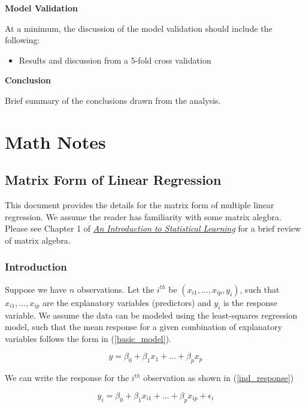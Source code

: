 \documentclass[]{book}
\providecommand{\tightlist}{%
  \setlength{\itemsep}{0pt}\setlength{\parskip}{0pt}}
\begin{document}
\textbf{Model Validation}

At a minimum, the discussion of the model validation should include the
following:

\begin{itemize}
\tightlist
\item
  Results and discussion from a 5-fold cross validation
\end{itemize}

\textbf{Conclusion}

Brief summary of the conclusions drawn from the analysis.

\part{Math Notes}\label{part-math-notes}

\chapter{Matrix Form of Linear
Regression}\label{matrix-form-of-linear-regression}

This document provides the details for the matrix form of multiple
linear regression. We assume the reader has familiarity with some matrix
alegbra. Please see Chapter 1 of
\href{https://www-bcf.usc.edu/~gareth/ISL/}{\emph{An Introduction to
Statistical Learning}} for a brief review of matrix algebra.

\section{Introduction}\label{introduction-2}

Suppose we have \(n\) observations. Let the \(i^{th}\) be
\((x_{i1}, \ldots, x_{ip}, y_i)\), such that \(x_{i1}, \ldots, x_{ip}\)
are the explanatory variables (predictors) and \(y_i\) is the response
variable. We assume the data can be modeled using the least-squares
regression model, such that the mean response for a given combination of
explanatory variables follows the form in (\ref{basic_model}).

\begin{equation}
\label{basic_model}
y = \beta_0 + \beta_1 x_1 + \dots + \beta_p x_p 
\end{equation}

We can write the response for the \(i^{th}\) observation as shown in
(\ref{ind_response})

\begin{equation}
\label{ind_response}
y_i = \beta_0 + \beta_1 x_{i1} + \dots + \beta_p x_{ip} + \epsilon_i 
\end{equation}
\end{document}
